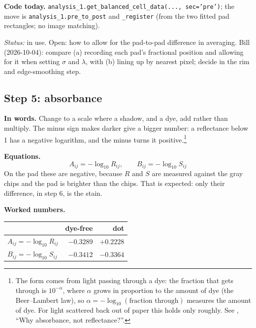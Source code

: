 \documentclass[11pt,letter]{article}
\newcommand{\file}[1]{\texttt{\seqsplit{#1}}}
\newcommand{\code}[1]{\texttt{#1}}
\newcommand{\status}[1]{\par\noindent\textit{Status:} #1\par}
\begin{document}
\textbf{Code today.}  \code{analysis\_1.get\_balanced\_cell\_data(...,
sec='pre')}; the move is \code{analysis\_1.pre\_to\_post} and
\code{\_register} (from the two fitted pad rectangles; no image
matching).

\status{in use.  Open: how to allow for the pad-to-pad difference in
averaging.  Bill (2026-10-04): compare (a) recording each pad's fractional
position and allowing for it when setting $\sigma$ and $\lambda$, with (b)
lining up by nearest pixel; decide in the rim and edge-smoothing step.}

\subsection{Step 5: absorbance}

\textbf{In words.}  Change to a scale where a shadow, and a dye, add rather
than multiply.  The minus sign makes darker give a bigger number: a
reflectance below 1 has a negative logarithm, and the minus turns it
positive.\footnote{The form comes from light passing through a dye: the
fraction that gets through is $10^{-\alpha}$, where $\alpha$ grows in
proportion to the amount of dye (the Beer--Lambert law), so
$\alpha = -\log_{10}(\text{fraction through})$ measures the amount of dye.  For light scattered back out of
paper this holds only roughly.  See \file{duotone\_guide.tex}, ``Why
absorbance, not reflectance?''.}

\textbf{Equations.}
\begin{equation}
  A_{ij} = -\log_{10} R_{ij}, \qquad B_{ij} = -\log_{10} S_{ij}
\end{equation}
On the pad these are negative, because $R$ and $S$ are measured against the
gray chips and the pad is brighter than the chips.  That is expected: only
their difference, in step 6, is the stain.

\textbf{Worked numbers.}

\medskip
\begin{center}
\begin{tabular}{@{}lrr@{}}
\toprule
 & dye-free & dot \\
\midrule
$A_{ij} = -\log_{10} R_{ij}$ & $-0.3289$ & $+0.2228$ \\
$B_{ij} = -\log_{10} S_{ij}$ & $-0.3412$ & $-0.3364$ \\
\bottomrule
\end{tabular}
\end{center}
\end{document}
